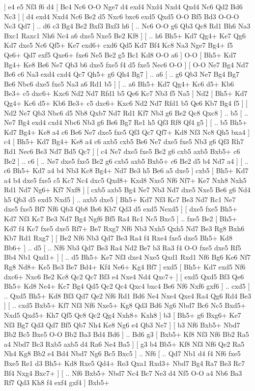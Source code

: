 \makegametitle 
|   e4   e5    Nf3   f6    d4 [  Bc4 Nc6  O-O Nge7  d4 exd4  Nxd4 Nxd4  Qxd4 Nc6  Qd2 Bd6  Nc3   ]  [  d4 exd4  Nxd4 Nc6  Be2 d5  Nxc6 bxc6  exd5 Qxd5  O-O Bf5  Bd3 O-O-O  Nc3 Qd7   ] .. d6    c3   Bg4    Be2   Bxf3    Bxf3   h6 [ .. Nc6  O-O g6  Qb3 Qc8  Rd1 Bh6  Na3 Bxc1  Raxc1 Nh6  Nc4 a6  dxe5 Nxe5  Be2 Kf8   ]  [ .. h6  Bh5+ Kd7  Qg4+ Ke7  Qg6 Kd7  dxe5 Nc6  Qf5+ Ke7  exd6+ cxd6  Qd5 Kd7  Bf4 Kc8  Na3 Nge7  Bg4+ f5  Qe6+ Qd7  exf5 Qxe6+  fxe6 Ne5  Be2 g5  Bc1 Kd8  O-O a6   ]  O-O [  Bh5+ Kd7  Bg4+ Ke8  Be6 Ne7  Qb3 b6  dxe5 fxe5  f4 d5  fxe5 Nec6  O-O   ]  [  O-O Ne7  Bg4 Nd7  Be6 c6  Na3 exd4  cxd4 Qc7  Qh5+ g6  Qh4 Bg7   ] .. a6 [ .. g6  Qb3 Ne7  Bg4 Bg7  Be6 Nbc6  dxe5 fxe5  Na3 a6  Rd1 b5   ]  [ .. a6  Bh5+ Kd7  Qg4+ Kc6  d5+ Kb6  Be3+ c5  dxc6+ Kxc6  Nd2 Nd7  Rfd1 b5  Qe6 Kc7  Nb3 f5  Na5   ]  Nd2 [  Bh5+ Kd7  Qg4+ Kc6  d5+ Kb6  Be3+ c5  dxc6+ Kxc6  Nd2 Nd7  Rfd1 b5  Qe6 Kb7  Bg4 f5   ]  [  Nd2 Ne7  Qb3 Nbc6  d5 Nb8  Qxb7 Nd7  Rd1 Kf7  Nb3 g6  Be2 Qc8  Qxc8   ] .. b5 [ .. Ne7  Bg4 exd4  cxd4 Nbc6  Nb3 g6  Be6 Bg7  Re1 h5  Qf3 Rf8  Qf4 g5   ]  [ .. b5  Bh5+ Kd7  Bg4+ Ke8  a4 c6  Be6 Ne7  dxe5 fxe5  Qf3 Qc7  Qf7+ Kd8  Nf3 Nc8  Qh5 bxa4   ]  c4 [  Bh5+ Kd7  Bg4+ Ke8  a4 c6  axb5 cxb5  Be6 Ne7  dxe5 fxe5  Nb3 g6  Qf3 Rh7  Rd1 Nec6  Be3 Nd7  Bd5 Qc7   ]  [  c4 Ne7  dxe5 fxe5  Be2 g6  cxb5 axb5  Bxb5+ c6  Be2   ] .. c6 [ .. Ne7  dxe5 fxe5  Be2 g6  cxb5 axb5  Bxb5+ c6  Be2 d5  b4 Nd7  a4   ]  [ .. c6  Bh5+ Kd7  a4 b4  Nb3 Kc8  Bg4+ Nd7  Be3 h5  Be6 a5  dxe5   ]  cxb5 [  Bh5+ Kd7  a4 b4  dxe5 fxe5  c5 Kc7  Nc4 dxc5  Qxd8+ Kxd8  Nxe5 Nf6  Nf7+ Ke7  Nxh8 Nxh5  Rd1 Nd7  Ng6+ Kf7  Nxf8   ]  [  cxb5 axb5  Bg4 Ne7  Nb3 Nd7  dxe5 Nxe5  Be6 g6  Nd4 h5  Qb3 d5  exd5 Nxd5   ] .. axb5    dxe5 [  Bh5+ Kd7  Nf3 Kc7  Be3 Nd7  Rc1 Ne7  dxe5 fxe5  Bf7 Nf6  Qb3 Qb8  Be6 Kb7  Qd3 d5  exd5 Nexd5   ]  [  dxe5 fxe5  Bh5+ Kd7  Nf3 Kc7  Be3 Nd7  Bg4 Ngf6  Bf5 Ra4  Rc1 Nc5  Bxc5   ] .. fxe5    Be2 [  Bh5+ Kd7  f4 Kc7  fxe5 dxe5  Rf7+ Be7  Rxg7 Nf6  Nb3 Nxh5  Qxh5 Nd7  Be3 Rg8  Bxh6 Kb7  Rd1 Rxg7   ]  [  Be2 Nf6  Nb3 Qd7  Be3 Ra4  f4 Rxe4  fxe5 dxe5  Bh5+ Kd8  Bb6+   ] .. d5 [ .. Nf6  Nb3 Qd7  Be3 Ra4  Nd2 Be7  b3 Ra3  f4 O-O  fxe5 dxe5  Rf5 Bb4  Nb1 Qxd1+   ]  [ .. d5  Bh5+ Ke7  Nf3 dxe4  Nxe5 Qxd1  Rxd1 Nf6  Bg6 Ke6  Nf7 Rg8  Nd8+ Ke5  Be3 Be7  Bd4+ Kf4  Ne6+ Kg4  Bf7   ]  exd5 [  Bh5+ Kd7  exd5 Nf6  dxc6+ Nxc6  Be2 Kc8  Qc2 Qc7  Bf3 e4  Nxe4 Nd4  Qxc7+   ]  [  exd5 Qxd5  Bf3 Qe6  Bh5+ Kd8  Ne4+ Kc7  Bg4 Qd5  Qc2 Qc4  Qxc4 bxc4  Be6 Nf6  Nxf6 gxf6   ] .. cxd5 [ .. Qxd5  Bh5+ Kd8  Bf3 Qd7  Qe2 Nf6  Rd1 Bd6  Ne4 Nxe4  Qxe4 Ra4  Qg6 Rd4  Be3   ]  [ .. cxd5  Bxb5+ Kf7  Nf3 Nf6  Nxe5+ Kg8  Qd3 Bd6  Ng6 Nbd7  Bc6 Nc5  Bxd5+ Nxd5  Qxd5+ Kh7  Qf5 Qc8  Qc2 Qg4  Nxh8+ Kxh8   ]  b3 [  Bh5+ g6  Bxg6+ Ke7  Nf3 Bg7  Qd3 Qd7  Bf5 Qb7  Nh4 Ke8  Ng6 e4  Qb3 Ne7   ]  [  b3 Nf6  Bxb5+ Nbd7  Bb2 Bc5  Bxe5 O-O  Bb2 Ba3  Bd4 Bd6   ] .. Bd6    g3 [  Bxb5+ Kf8  Nf3 Nf6  Bb2 Ra5  a4 Nbd7  Bc3 Rxb5  axb5 d4  Ra6 Ne4  Ba5   ]  [  g3 b4  Bb5+ Kf8  Nf3 Nf6  Qe2 Ra5  Nh4 Kg8  Bb2 e4  Bd4 Nbd7  Ng6 Bc5  Bxc5   ] .. Nf6 [ .. Qd7  Nb1 d4  f4 Nf6  fxe5 Bxe5  Re1 d3  Bh5+ Kd8  Rxe5 Qd4+  Re3 Qxa1  Rxd3+ Nbd7  Bg4 Ra7  Be3 Rc7  Bf4 Nxg4  Bxc7+   ]  [ .. Nf6  Bxb5+ Nbd7  Nc4 Bc7  Ne3 d4  Nf5 O-O  a4 Nb6  Ba3 Rf7  Qd3 Kh8  f4 exf4  gxf4   ]  Bxb5+   